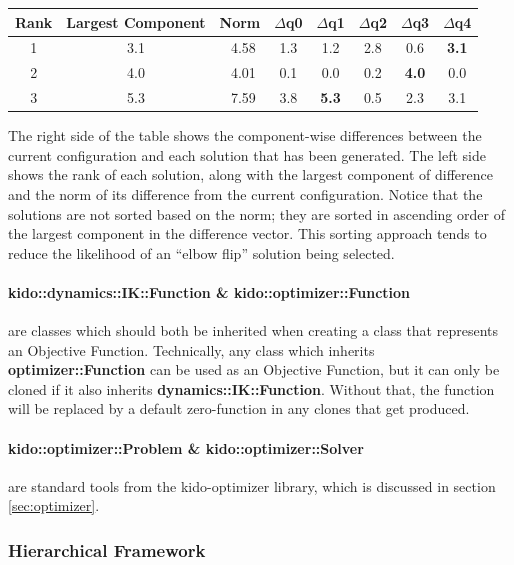 \begin{tabular}{| c | c | c || c | c | c | c | c |}
  \hline
  Rank & \textbf{Largest Component} & Norm  & $\Delta$q0 & $\Delta$q1 & $\Delta$q2 & $\Delta$q3 & $\Delta$q4 \\ \hline
  1    & 3.1                        & ~4.58 & 1.3 & 1.2          & 2.8 & 0.6          & \textbf{3.1} \\ \hline
  2    & 4.0                        & ~4.01 & 0.1 & 0.0          & 0.2 & \textbf{4.0} & 0.0          \\ \hline
  3    & 5.3                        & ~7.59 & 3.8 & \textbf{5.3} & 0.5 & 2.3          & 3.1          \\ \hline
\end{tabular}

The right side of the table shows the component-wise differences between the current configuration and each solution that has been generated. The left side shows the rank of each solution, along with the largest component of difference and the norm of its difference from the current configuration. Notice that the solutions are not sorted based on the norm; they are sorted in ascending order of the largest component in the difference vector. This sorting approach tends to reduce the likelihood of an ``elbow flip'' solution being selected.

\paragraph{kido::dynamics::IK::Function \& kido::optimizer::Function} are classes which should both be inherited when creating a class that represents an Objective Function. Technically, any class which inherits \textbf{optimizer::Function} can be used as an Objective Function, but it can only be cloned if it also inherits \textbf{dynamics::IK::Function}. Without that, the function will be replaced by a default zero-function in any clones that get produced.

\paragraph{kido::optimizer::Problem \& kido::optimizer::Solver} are standard tools from the kido-optimizer library, which is discussed in section \ref{sec:optimizer}.

\subsubsection{Hierarchical Framework}
\label{sec:ik_hier_framework}

